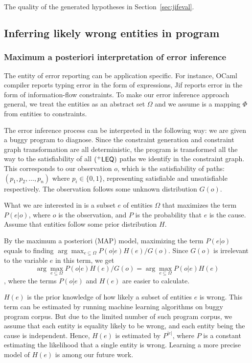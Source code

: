The quality of the generated hypotheses in Section~\ref{sec:jifeval}.

\subsection{Inferring likely wrong entities in program}
\label{sec:mapmodel}

\subsubsection{Maximum a posteriori interpretation of error inference}

The entity of error reporting can be application specific. For
instance, OCaml compiler reports typing error in the form of
expressions, Jif reports error in the form of information-flow
constraints. To make our error inference approach general, we treat
the entities as an abstract set $\Omega$ and we assume is a mapping
$\Phi$ from entities to constraints.

The error inference process can be interpreted in the following way:
we are given a buggy program to diagnose. Since the constraint
generation and constraint graph transformation are all deterministic,
the program is transformed all the way to the satisfiability of all
$(^{+}\mathsf{LEQ})$ paths we identify in the constraint graph. This
corresponds to our observation $o$, which is the satisfiability of
paths: $(p_1, p_2, \dots, p_n)$ where $p_i\in \{0, 1\}$, representing
satisfiable and unsatisfiable respectively.  The observation follows
some unknown distribution $G(o)$.

What we are interested in is a subset $e$ of entities $\Omega$ that
maximizes the term $P(e|o)$, where $o$ is the observation, and $P$ is
the probability that $e$ is the cause. Assume that entities follow some
prior distribution $H$.

By the maximum a posteriori (MAP) model, maximizing the term $P(e|o)$
equals to finding $\arg\max_{e \subseteq \Omega} P(o|e) H(e) / G(o)$.
Since $G(o)$ is irrelevant to the variable $e$ in this term, we get
\[\arg\max_{e \subseteq \Omega} P(o|e) H(e) / G(o) =  \arg\max_{e
\subseteq \Omega} P(o|e) H(e)\] , where the terms $P(o|e)$ and $H(e)$
are easier to calculate.

$H(e)$ is the prior knowledge of how likely a subset of entities $e$ is
wrong. This term can be estimated by running machine learning algorithms on
buggy program corpus. But due to the limited number of such program corpus, we
assume that each entity is equality likely to be wrong, and each
entity being the cause is independent. Hence, $H(e)$ is estimated by
$P^{|e|}$, where $P$ is a constant estimating the likelihood that a
single entity is wrong. Learning a more precise model of $H(e)$ is
among our future work.

